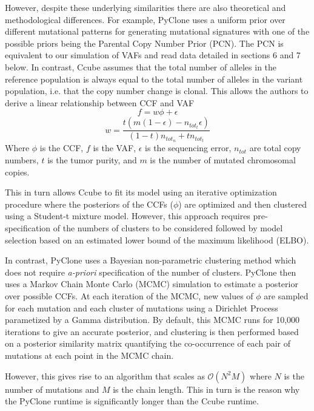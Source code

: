 \documentclass{article}
\begin{document}
However, despite these underlying similarities there are also theoretical and methodological differences. For example, PyClone uses a uniform prior over different mutational patterns for generating mutational signatures with one of the possible priors being the Parental Copy Number Prior (PCN). The PCN is equivalent to our simulation of VAFs and read data detailed in sections 6 and 7 below. In contrast, Ccube assumes that the total number of alleles in the reference population is always equal to the total number of alleles in the variant population, i.e. that the copy number change is clonal. This allows the authors to derive a linear relationship between CCF and VAF
\begin{equation}
f = w \phi + \epsilon
\end{equation}
\begin{equation}
w = \dfrac{t(m(1-\epsilon)-n_{tot_t}\epsilon)}{(1-t)n_{tot_n}+t n_{tot_t}}
\end{equation}
Where $\phi$ is the CCF, $f$ is the VAF, $\epsilon$ is the sequencing error, $n_{tot}$ are total copy numbers, $t$ is the tumor purity, and $m$ is the number of mutated chromosomal copies.

This in turn allows Ccube to fit its model using an iterative optimization procedure where the posteriors of the CCFs ($\phi$) are optimized and then clustered using a Student-t mixture model. However, this approach requires pre-specification of the numbers of clusters to be considered followed by model selection based on an estimated lower bound of the maximum likelihood (ELBO).

In contrast, PyClone uses a Bayesian non-parametric clustering method which does not require \textit{a-priori} specification of the number of clusters. PyClone then uses a Markov Chain Monte Carlo (MCMC) simulation to estimate a posterior over possible CCFs. At each iteration of the MCMC, new values of $\phi$ are sampled for each mutation and each cluster of mutations using a Dirichlet Process parametized by a Gamma distribution. By default, this MCMC runs for 10,000 iterations to give an accurate posterior, and clustering is then performed based on a posterior similarity matrix quantifying the co-occurrence of each pair of mutations at each point in the MCMC chain.

However, this gives rise to an algorithm that scales as $\mathcal{O}(N^2M)$ where $N$ is the number of mutations and $M$ is the chain length. This in turn is the reason why the PyClone runtime is significantly longer than the Ccube runtime.
\end{document}
